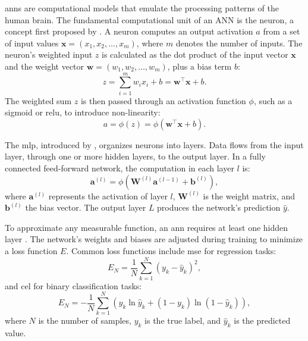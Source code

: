 \documentclass[12pt, a4paper, headinclude, twoside, plainheadsepline, open=right, numbers=noenddot, hidelinks, toc=listof, toc=bibliography]{scrreprt}
\begin{document}
\Acp{ann} are computational models that emulate the processing patterns of the human brain. The fundamental computational unit of an ANN is the neuron, a concept first proposed by \citeauthor{mccullochLogicalCalculusIdeas1943} \cite{mccullochLogicalCalculusIdeas1943}. 
A neuron computes an output activation $a$ from a set of input values $\mathbf{x} = (x_1, x_2, \ldots, x_m)$, where $m$ denotes the number of inputs. 
The neuron's weighted input $z$ is calculated as the dot product of the input vector $\mathbf{x}$ and the weight vector $\mathbf{w} = (w_1, w_2, \ldots, w_m)$, plus a bias term $b$:
\begin{equation}
z = \sum_{i=1}^{m} w_i x_i + b = \mathbf{w}^\top \mathbf{x} + b.
\end{equation}
The weighted sum $z$ is then passed through an activation function $\phi$, such as a sigmoid or \ac{relu}, to introduce non-linearity:
\begin{equation}
a = \phi(z) = \phi(\mathbf{w}^\top \mathbf{x} + b).
\end{equation}

The \ac{mlp}, introduced by \citeauthor{rosenblattPerceptronProbabilisticModel1958} \cite{rosenblattPerceptronProbabilisticModel1958}, organizes neurons into layers. 
Data flows from the input layer, through one or more hidden layers, to the output layer. In a fully connected feed-forward network, the computation in each layer $l$ is:
\begin{equation}
\mathbf{a}^{(l)} = \phi (\mathbf{W}^{(l)} \mathbf{a}^{(l-1)} + \mathbf{b}^{(l)}),
\end{equation}
where $\mathbf{a}^{(l)}$ represents the activation of layer $l$, $\mathbf{W}^{(l)}$ is the weight matrix, and $\mathbf{b}^{(l)}$ the bias vector. 
The output layer $L$ produces the network's prediction $\hat{y}$.

To approximate any measurable function, an \ac{ann} requires at least one hidden layer \cite{hornikMultilayerFeedforwardNetworks1989}. 
The network's weights and biases are adjusted during training to minimize a loss function $E$. Common loss functions include \ac{mse} for regression tasks:
\begin{equation}
E_N = \frac{1}{N} \sum_{k=1}^{N}(y_{k} - \hat{y}_{k})^2,
\end{equation}
and \ac{cel} for binary classification tasks:
\begin{equation}
E_N = -\frac{1}{N} \sum_{k=1}^{N} \left( y_k \ln{\hat{y}_k} + (1-y_k) \ln{(1-\hat{y}_k)} \right),
\end{equation}
where $N$ is the number of samples, $y_k$ is the true label, and $\hat{y}_k$ is the predicted value.
\end{document}
